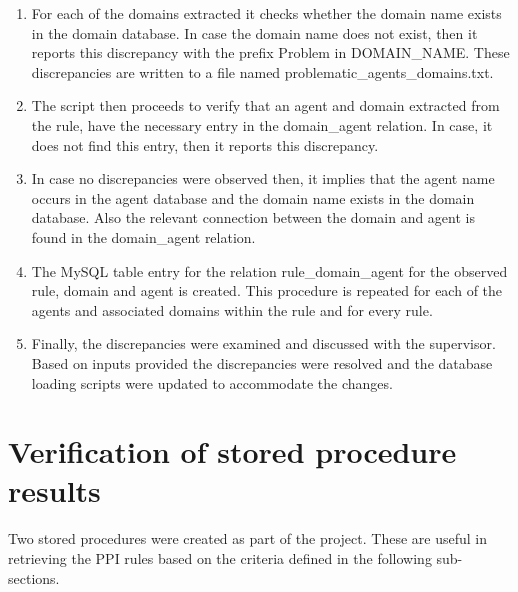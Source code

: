 \documentclass[msc,deptreport,ai]{infthesis}      %
\begin{document}
\begin{enumerate}
	\item For each of the domains extracted it checks whether the domain name exists in the domain database. In case the domain name does not exist, then it reports this discrepancy with the prefix Problem in DOMAIN\_NAME. These discrepancies are written to a file named problematic\_agents\_domains.txt.
	\item The script then proceeds to verify that an agent and domain extracted from the rule, have the necessary entry in the domain\_agent relation. In case, it does not find this entry, then it reports this discrepancy.
	\item  In case no discrepancies were observed then, it implies that the agent name occurs in the agent database and the domain name exists in the domain database. Also the relevant connection between the domain and agent is found in the domain\_agent relation.
	\item The MySQL table entry for the relation rule\_domain\_agent for the observed rule, domain and agent is created. This procedure is repeated for each of the agents and associated domains within the rule and for every rule.	
	\item Finally, the discrepancies were examined and discussed with the  supervisor. Based on inputs provided the discrepancies were resolved and the database loading scripts were updated to accommodate the changes.
\end{enumerate}
\section{Verification of stored procedure results}
Two stored procedures were created as part of the project. These are useful in retrieving the PPI rules based on the criteria defined in the following sub-sections.
\end{document}

